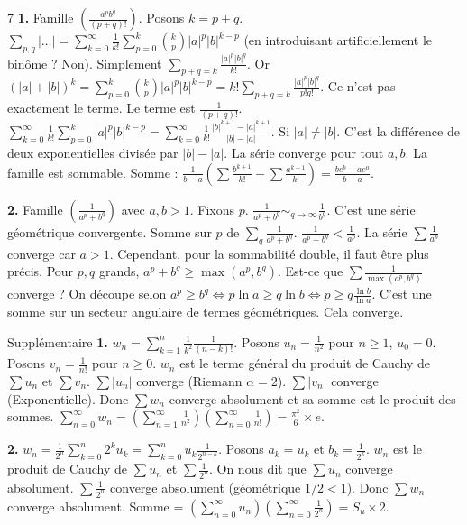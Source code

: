 \begin{correction}{7}
\textbf{1.} Famille $(\frac{a^p b^q}{(p+q)!})$.
Posons $k=p+q$.
$\sum_{p,q} | \dots | = \sum_{k=0}^\infty \frac{1}{k!} \sum_{p=0}^k \binom{k}{p} |a|^p |b|^{k-p}$ (en introduisant artificiellement le binôme ? Non).
Simplement $\sum_{p+q=k} \frac{|a|^p |b|^q}{k!}$.
Or $(|a|+|b|)^k = \sum_{p=0}^k \binom{k}{p} |a|^p |b|^{k-p} = k! \sum_{p+q=k} \frac{|a|^p |b|^q}{p! q!}$.
Ce n'est pas exactement le terme.
Le terme est $\frac{1}{(p+q)!}$.
$\sum_{k=0}^\infty \frac{1}{k!} \sum_{p=0}^k |a|^p |b|^{k-p} = \sum_{k=0}^\infty \frac{1}{k!} \frac{|b|^{k+1}-|a|^{k+1}}{|b|-|a|}$.
Si $|a| \neq |b|$. C'est la différence de deux exponentielles divisée par $|b|-|a|$.
La série converge pour tout $a,b$. La famille est sommable.
Somme : $\frac{1}{b-a} ( \sum \frac{b^{k+1}}{k!} - \sum \frac{a^{k+1}}{k!} ) = \frac{b e^b - a e^a}{b-a}$.

\textbf{2.} Famille $(\frac{1}{a^p+b^q})$ avec $a,b > 1$.
Fixons $p$. $\frac{1}{a^p+b^q} \sim_{q \to \infty} \frac{1}{b^q}$. C'est une série géométrique convergente.
Somme sur $p$ de $\sum_q \frac{1}{a^p+b^q}$.
$\frac{1}{a^p+b^q} < \frac{1}{a^p}$.
La série $\sum \frac{1}{a^p}$ converge car $a>1$.
Cependant, pour la sommabilité double, il faut être plus précis.
Pour $p,q$ grands, $a^p+b^q \ge \max(a^p, b^q)$.
Est-ce que $\sum \frac{1}{\max(a^p, b^q)}$ converge ?
On découpe selon $a^p \ge b^q \iff p \ln a \ge q \ln b \iff p \ge q \frac{\ln b}{\ln a}$.
C'est une somme sur un secteur angulaire de termes géométriques. Cela converge.
\end{correction}

\begin{correction}{Supplémentaire}
\textbf{1.} $w_n = \sum_{k=1}^n \frac{1}{k^2} \frac{1}{(n-k)!}$.
Posons $u_n = \frac{1}{n^2}$ pour $n \ge 1$, $u_0=0$.
Posons $v_n = \frac{1}{n!}$ pour $n \ge 0$.
$w_n$ est le terme général du produit de Cauchy de $\sum u_n$ et $\sum v_n$.
$\sum |u_n|$ converge (Riemann $\alpha=2$).
$\sum |v_n|$ converge (Exponentielle).
Donc $\sum w_n$ converge absolument et sa somme est le produit des sommes.
$\sum_{n=0}^\infty w_n = (\sum_{n=1}^\infty \frac{1}{n^2}) (\sum_{n=0}^\infty \frac{1}{n!}) = \frac{\pi^2}{6} \times e$.

\textbf{2.} $w_n = \frac{1}{2^n} \sum_{k=0}^n 2^k u_k = \sum_{k=0}^n u_k \frac{1}{2^{n-k}}$.
Posons $a_k = u_k$ et $b_k = \frac{1}{2^k}$.
$w_n$ est le produit de Cauchy de $\sum u_n$ et $\sum \frac{1}{2^n}$.
On nous dit que $\sum u_n$ converge absolument.
$\sum \frac{1}{2^n}$ converge absolument (géométrique $1/2 < 1$).
Donc $\sum w_n$ converge absolument.
Somme = $(\sum_{n=0}^\infty u_n) (\sum_{n=0}^\infty \frac{1}{2^n}) = S_u \times 2$.
\end{correction}
